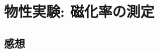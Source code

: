 \documentclass[../../sp_2014.tex]{subfiles}
\begin{document}
\section{物性実験: 磁化率の測定}


\subsection*{感想}
\end{document}
